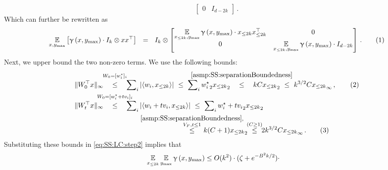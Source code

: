 \documentclass[11pt,letterpaper]{article}
\theoremstyle{plain}
\theoremstyle{definition}
\theoremstyle{remark}
\newcommand{\yesnum}{\addtocounter{equation}{1}\tag{\theequation}}
\newcommand{\Stackrel}[2]{\stackrel{\mathmakebox[\widthof{\ensuremath{#2}}]{#1}}{#2}}
\def\abs#1{\left| #1 \right|}
\newcommand{\inparen}[1]{\ensuremath{\left(#1\right)}}
\newcommand{\insquare}[1]{\ensuremath{\left[#1\right]}}
\newcommand{\inangle}[1]{\left\langle#1\right\rangle}
\newcommand{\snorm}[1]{\ensuremath{\ensuremath{\| #1 \|}}}
\let\norm\relax
\newcommand{\norm}[1]{\ensuremath{\left\lVert #1 \right\rVert}}
\newcommand{\E}{\operatornamewithlimits{\mathbb{E}}}
\newcommand{\Ex}{\E}
\renewcommand{\gamma}{\upgamma}
\newcommand{\ymax}{y_{\max}}
\begin{document}
{{\[{{\begin{bmatrix}
                    0 & I_{d-2k}
                \end{bmatrix}
            }
        }\,.
    \]
    Which can further be rewritten as 
    \[
        \Ex_{x,\ymax}\insquare{
            \gamma\inparen{x,\ymax}\cdot I_{k}\otimes xx^\top
            }
        ~~=~~
        I_{k}\otimes 
        \begin{bmatrix}
            \Ex\limits_{x_{\leq 2k},\ymax}{
            \gamma\inparen{x,\ymax}
        }\cdot  x_{\leq 2k}x_{\leq 2k}^\top & 0\\
            0 & \Ex\limits_{x_{\leq 2k},\ymax}{
            \gamma\inparen{x,\ymax}
        }\cdot  I_{d-2k}
        \end{bmatrix} 
        \,.
        \yesnum\label{eq:SS:LC:part2:spectralMatrix}
    \]
    Next, we upper bound the two non-zero terms.
    We use the following bounds:
    \begin{align*} 
             \snorm{W_0^\top x}_\infty 
        &~~~\Stackrel{\substack{W_0=[w_i^\star]_i\\[1.5mm]}}{\leq}~~~
            \sum\nolimits_i \abs{\inangle{w_i,x_{\leq 2k}}}
        ~\leq~
            \sum\nolimits_i \norm{w^\star_i}_2 \norm{x_{\leq 2k}}_2
        \quad\Stackrel{\substack{\rm\cref{asmp:SS:separationBoundedness}\\[1.5mm]}}{\leq}\quad 
            kC\norm{x_{\leq 2k}}_2
        ~\leq~ k^{3/2}C\norm{x_{\leq 2k}}_\infty\,, \yesnum\label{eq:SS:LC:simplebounds1}\\
        \snorm{W_t^\top x}_\infty 
        &~~~\Stackrel{\substack{W_0=[w_i^\star+tv_i]_i\\[1.5mm]}}{\leq}~~~
            \sum\nolimits_i \abs{\inangle{w_i+tv_i,x_{\leq 2k}}}
        ~\leq~ 
        \sum\nolimits_i \norm{w^\star_i + t v_i}_2 \norm{x_{\leq 2k}}_2\\
        &\qquad\qquad\qquad\qquad\qquad\quad\hspace{0.5mm}
            ~~~\Stackrel{\substack{\rm\cref{asmp:SS:separationBoundedness},\\\norm{V}_F, t\leq 1}}{\leq}\quad 
        k(C+1)\norm{x_{\leq 2k}}_2
        ~\Stackrel{(C\geq 1)}{\leq}~
            2k^{3/2}C \norm{x_{\leq 2k}}_\infty \,. 
        \yesnum\label{eq:SS:LC:simplebounds2}
    \end{align*}
    Substituting these bounds in \cref{eq:SS:LC:step2} implies that 
    \begin{align*}
        \Ex_{x_{\leq 2k}}\Ex_{\ymax}{\gamma\inparen{x,\ymax}}
        &\leq 
        O(k^2)\cdot
            (\zeta + e^{-B^2 k/2})\cdot

\end{align*}}}
\end{document}
